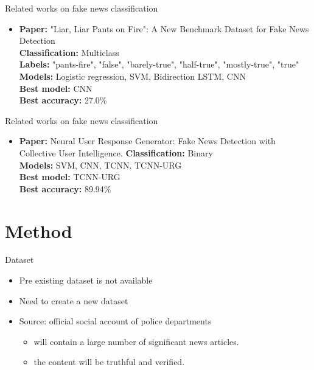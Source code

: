 \documentclass[12pt]{beamer}
\begin{document}
\begin{frame}{Related works on fake news classification}
    \begin{itemize}
        \item
        \textbf{Paper:} "Liar, Liar Pants on Fire": A New Benchmark Dataset for Fake News Detection \\
        \textbf{Classification:} Multiclass \\
        \textbf{Labels:} "pants-fire", "false", "barely-true", "half-true", "mostly-true", "true"\\
        \textbf{Models:} Logistic regression, SVM, Bidirection LSTM, CNN \\
        \textbf{Best model:} CNN \\
        \textbf{Best accuracy:} 27.0\% \\
    \end{itemize}
\end{frame}

\begin{frame}{Related works on fake news classification}
    \begin{itemize}
        \item
        \textbf{Paper:} Neural User Response Generator: Fake News Detection with Collective User Intelligence.
        \textbf{Classification:} Binary \\
        \textbf{Models:} SVM, CNN, TCNN, TCNN-URG \\
        \textbf{Best model:} TCNN-URG \\
        \textbf{Best accuracy:} 89.94\% \\
    \end{itemize}
\end{frame}

\section{Method}

\begin{frame}{Dataset}
    \begin{itemize}
        \item Pre existing dataset is not available
        \item Need to create a new dataset
        \item Source: official social account of police departments \begin{itemize}
            \item will contain a large number of significant news articles.
            \item the content will be truthful and verified.
        \end{itemize}
    \end{itemize}
\end{frame}
\end{document}
